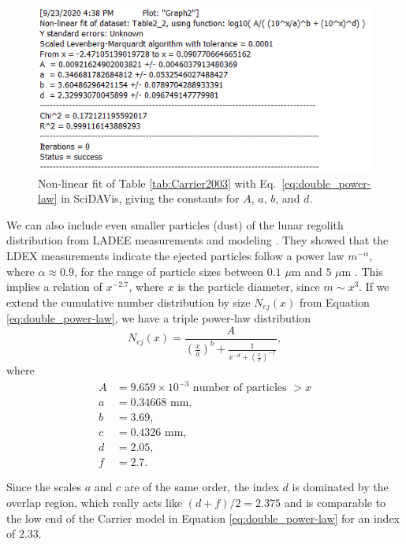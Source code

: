\documentclass{hitec}
\numberwithin{equation}{section}
\begin{document}
\begin{figure}[h!]
	\centering
	\includegraphics[scale=1]{Fit-to-Nej.PNG}
	\caption{Non-linear fit of Table \ref{tab:Carrier2003} with Eq.\ \ref{eq:double_power-law} in \textsf{SciDAVis}, giving the constants for $A$, $a$, $b$, and $d$.}\label{fig:Fit-to-Nej}
\end{figure}

We can also include even smaller particles (dust) of the lunar regolith distribution from LADEE measurements and modeling \citep{horanyi2015permanent}. They showed that the LDEX measurements indicate the ejected particles follow a power law $m^{-\alpha}$, where $\alpha\approx 0.9$, for the range of particle sizes between $0.1$ $\mu$m and $5$ $\mu$m \citep{horanyi2014lunar}. This implies a relation of $x^{-2.7}$, where $x$ is the particle diameter, since $m\sim x^3$. If we extend the cumulative number distribution by size $N_{ej}(x)$ from Equation \eqref{eq:double_power-law}, we have a triple power-law distribution
\begin{equation}
N_{ej}(x) = \frac{A}{\left(\frac{x}{a}\right)^b + \frac{1}{x^{-d} + \left(\frac{x}{c}\right)^{-f}}},
\end{equation}
where
\begin{align}
A &= 9.659\times 10^{-3} \text{ number of particles $>x$}\\\nonumber
a &= 0.34668\text{ mm},\\\nonumber
b &= 3.69,\\\nonumber
c &= 0.4326\text{ mm},\\\nonumber
d &= 2.05,\\\nonumber
f &= 2.7.\nonumber
\end{align}

Since the scales $a$ and $c$ are of the same order, the index $d$ is dominated by the overlap region, which really acts like $(d+f)/2 = 2.375$ and is comparable to the low end of the Carrier model in Equation \eqref{eq:double_power-law} for an index of $2.33$.
\end{document}
